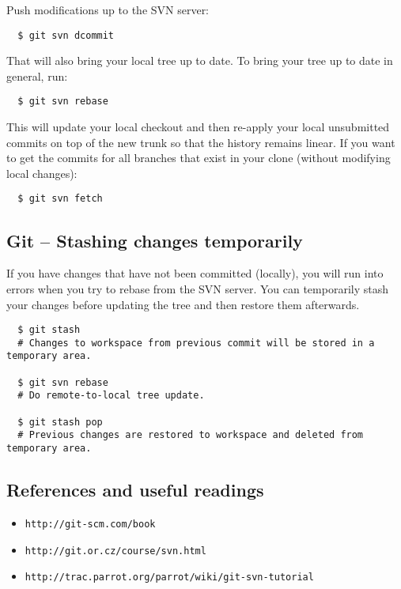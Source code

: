 \documentclass[11pt,twoside]{article}
\begin{document}
Push modifications up to the SVN server:
\begin{verbatim}
  $ git svn dcommit
\end{verbatim}
That will also bring your local tree up to date. To bring your tree up to date in general, run:
\begin{verbatim}
  $ git svn rebase
\end{verbatim}
This will update your local checkout and then re-apply your local unsubmitted commits on top of the new trunk so that the history remains linear.
If you want to get the commits for all branches that exist in your clone (without modifying local changes):
\begin{verbatim}
  $ git svn fetch
\end{verbatim}

\subsection*{Git -- Stashing changes temporarily}

If you have changes that have not been committed (locally), you will run into errors when you try to rebase from the SVN server.
You can temporarily stash your changes before updating the tree and then restore them afterwards.

\begin{verbatim}
  $ git stash
  # Changes to workspace from previous commit will be stored in a temporary area.

  $ git svn rebase
  # Do remote-to-local tree update.

  $ git stash pop
  # Previous changes are restored to workspace and deleted from temporary area.
\end{verbatim}

\subsection*{References and useful readings}

\begin{itemize}
\item \verb|http://git-scm.com/book|
\item \verb|http://git.or.cz/course/svn.html|
\item \verb|http://trac.parrot.org/parrot/wiki/git-svn-tutorial|
\end{itemize}
\end{document}
